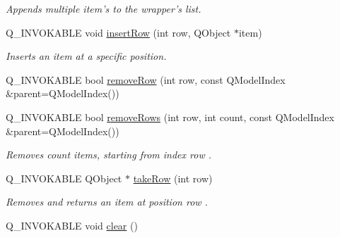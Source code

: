 \begin{DoxyCompactItemize}
\begin{DoxyCompactList}\small\item\em Appends multiple item's to the wrapper's list. \end{DoxyCompactList}\item 
\hypertarget{classQListQmlWrapper_a3e433fd322140e50f6de31d786fd1e90}{Q\-\_\-\-I\-N\-V\-O\-K\-A\-B\-L\-E void \hyperlink{classQListQmlWrapper_a3e433fd322140e50f6de31d786fd1e90}{insert\-Row} (int row, Q\-Object $\ast$item)}\label{classQListQmlWrapper_a3e433fd322140e50f6de31d786fd1e90}

\begin{DoxyCompactList}\small\item\em Inserts an item at a specific position. \end{DoxyCompactList}\item 
Q\-\_\-\-I\-N\-V\-O\-K\-A\-B\-L\-E bool \hyperlink{classQListQmlWrapper_ab23231912af75b767ed96a5061c18810}{remove\-Row} (int row, const Q\-Model\-Index \&parent=Q\-Model\-Index())
\item 
\hypertarget{classQListQmlWrapper_a2daa2ca530b342bd493928a4cf99eb22}{Q\-\_\-\-I\-N\-V\-O\-K\-A\-B\-L\-E bool \hyperlink{classQListQmlWrapper_a2daa2ca530b342bd493928a4cf99eb22}{remove\-Rows} (int row, int count, const Q\-Model\-Index \&parent=Q\-Model\-Index())}\label{classQListQmlWrapper_a2daa2ca530b342bd493928a4cf99eb22}

\begin{DoxyCompactList}\small\item\em Removes {\ttfamily count} items, starting from index {\ttfamily row} . \end{DoxyCompactList}\item 
\hypertarget{classQListQmlWrapper_a7baf8a6a8a3232a227423ddae0cd261b}{Q\-\_\-\-I\-N\-V\-O\-K\-A\-B\-L\-E Q\-Object $\ast$ \hyperlink{classQListQmlWrapper_a7baf8a6a8a3232a227423ddae0cd261b}{take\-Row} (int row)}\label{classQListQmlWrapper_a7baf8a6a8a3232a227423ddae0cd261b}

\begin{DoxyCompactList}\small\item\em Removes and returns an item at position {\ttfamily row} . \end{DoxyCompactList}\item 
\hypertarget{classQListQmlWrapper_a3ec0f6232df2dfee1eb2e2334efc76aa}{Q\-\_\-\-I\-N\-V\-O\-K\-A\-B\-L\-E void \hyperlink{classQListQmlWrapper_a3ec0f6232df2dfee1eb2e2334efc76aa}{clear} ()}\label{classQListQmlWrapper_a3ec0f6232df2dfee1eb2e2334efc76aa}


\end{DoxyCompactItemize}
